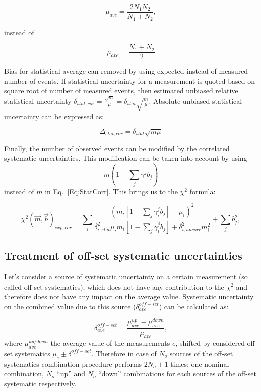 \begin{equation}
  \mu_{ave} = \frac{2N_1N_2}{N_1+N_2},
\end{equation}

instead of 

\begin{equation}
  \mu_{ave} = \frac{N_1 + N_2}{2}
\end{equation}

Bias for statistical average can removed by using expected instead of measured number of events. If statistical uncertainty for a measurement is quoted based on square root of number of measured events, then estimated unbiased relative statistical uncertainty $\delta_{stat,cor} = \frac{\sqrt{m}}{\mu} = \delta_{stat} \sqrt{\frac{m}{\mu}} $. Absolute unbiased statistical uncertainty can be expressed as:

\begin{equation}
 \Delta_{stat,cor} = \delta_{stat} \sqrt{m\mu}
  \label{Eq:StatCorr}
\end{equation}

Finally, the number of observed events can be modified by the correlated systematic uncertainties. This modification can be taken into account by using 
\begin{equation}
  m(1-\sum_j \gamma^jb_j)
  \label{Eq:StatCorr2}
\end{equation}
instead of $m$ in Eq.~\ref{Eq:StatCorr}. This brings us to the $\chi^2$  formula:

\begin{equation}
  \chi^2(\vec{m},\vec{b})_{exp,cor} = \sum_{i} \frac{(m_i[1-\sum_j \gamma_i^jb_j]  - \mu_i)^2}{\delta_{i, stat}^2\mu_im_i[1-\sum_j \gamma_i^jb_j] + \delta_{i, uncorr}^2m_i^2} + \sum_{j}
  b_j^2,
  \label{Eq:StatCorrChiSq2}
\end{equation}


\subsection{Treatment of off-set systematic uncertainties}
\label{Sec:offset}

Let's consider a source of systematic uncertainty on a certain measurement (so called off-set systematics), which does not have any contribution to the $\chi^2$ and therefore does not have any impact on the average value. Systematic uncertainty on the combined value due to this source ($\delta^{off-set}_{ave}$) can be calculated as: 

 \begin{equation}
  \delta^{off-set}_{ave} = \frac{\mu_{ave}^{up} - \mu_{ave}^{down}}{\mu_{ave}},
\end{equation}
where $\mu_{ave}^{up/down}$ the average value of the measurements $e$, shifted by considered off-set systematics $\mu_e \pm \delta^{off-set}$. Therefore in case of $N_o$ sources of the off-set systematics combination procedure performs $2N_o+1$ times: one nominal combination, $N_o$ ``up'' and $N_o$ ``down'' combinations for each sources of the off-set systematic respectively.


